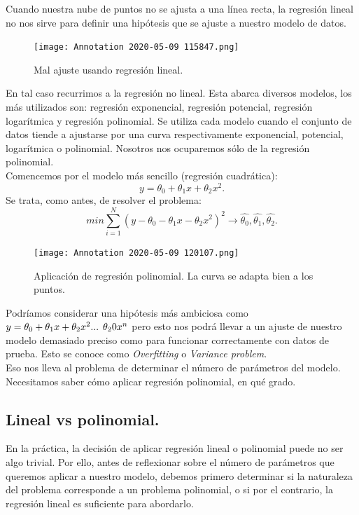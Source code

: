 \documentclass[a4paper,11pt]{article}
\begin{document}
Cuando nuestra nube de puntos no se ajusta a una línea recta, la regresión lineal no nos sirve para definir una hipótesis que se ajuste a nuestro modelo de datos.
\begin{figure}[H]
\centering
\texttt{[image: Annotation 2020-05-09 115847.png]}
\caption{Mal ajuste usando regresión lineal.}
\end{figure}
\noindent
En tal caso recurrimos a la regresión no lineal. Esta abarca diversos modelos, los más utilizados son: regresión exponencial, regresión potencial, regresión logarítmica y regresión polinomial. Se utiliza cada modelo cuando el conjunto de
datos tiende a ajustarse por una curva respectivamente exponencial, potencial,
logarítmica o polinomial. Nosotros nos ocuparemos sólo de la regresión polinomial.\\

\noindent
Comencemos por el modelo más sencillo (regresión cuadrática):
\[
 y=\theta_0+\theta_1 x+\theta_2 x^2.
\]
Se trata, como antes, de resolver el problema:
\[
 min\sum_{i=1}^{N}(y-\theta_0-\theta_1 x-\theta_2 x^2)^2\longrightarrow \hat{\theta_0},\hat{\theta_1},\hat{\theta_2}.
\] 
\begin{figure}[H]
\centering
\texttt{[image: Annotation 2020-05-09 120107.png]}
\caption{Aplicación de regresión polinomial. La curva se adapta bien a los puntos.}
\end{figure}
\noindent
Podríamos considerar una hipótesis más ambiciosa como $y=\theta_0+\theta_1 x+\theta_2 x^2 ...\hspace{0.15cm} \theta_20 x^n$ pero esto nos podrá llevar a un ajuste de nuestro modelo demasiado preciso como para funcionar correctamente con datos de prueba. Esto se conoce como \textit{Overfitting} o \textit{Variance problem}.\\

\noindent
Eso nos lleva al problema de determinar el número de parámetros del modelo. Necesitamos saber cómo aplicar regresión polinomial, en qué grado.
\subsection{Lineal vs polinomial.}

En la práctica, la decisión de aplicar regresión lineal o polinomial puede no ser algo trivial. Por ello, antes de reflexionar sobre el número de parámetros que queremos aplicar a nuestro modelo, debemos primero determinar si la naturaleza del problema corresponde a un problema polinomial, o si por el contrario, la regresión lineal es suficiente para abordarlo.
\end{document}
